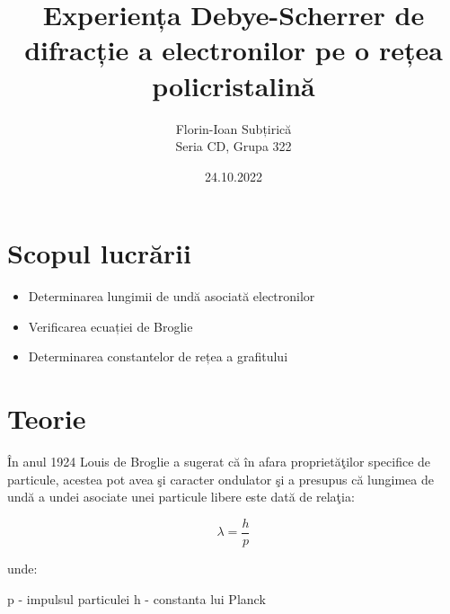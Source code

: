 \documentclass{article}
\title          {Experiența Debye-Scherrer de difracție a electronilor pe o rețea policristalină}
\author         {Florin-Ioan Subțirică \\ Seria CD, Grupa 322}
\date           {24.10.2022}
\begin{document}
\maketitle
\thispagestyle{empty} %
\pagebreak

\tableofcontents
\thispagestyle{empty}
\pagebreak

\section        {Scopul lucrării}

\begin{itemize}
    \item \makebox[6mm]{} Determinarea lungimii de undă asociată electronilor
    \item \makebox[6mm]{} Verificarea ecuației de Broglie
    \item \makebox[6mm]{} Determinarea constantelor de rețea a grafitului
\end{itemize}    

\section        {Teorie}

\makebox[1cm]{} În anul 1924 Louis de Broglie a sugerat că în afara proprietăţilor specifice de
particule, acestea pot avea şi caracter ondulator şi a presupus că lungimea de undă a undei
asociate unei particule libere este dată de relaţia: 

\begin{equation}
    \lambda = \frac{h}{p}
\end{equation}

unde: \newline

\makebox[1cm]{} p - impulsul particulei \newline
\makebox[1.53cm]{} h - constanta lui Planck \newline
\end{document}
